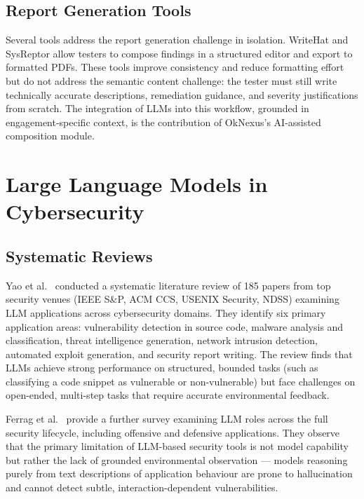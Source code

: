 \subsection{Report Generation Tools}

Several tools address the report generation challenge in isolation. WriteHat and SysReptor allow testers to compose findings in a structured editor and export to formatted PDFs. These tools improve consistency and reduce formatting effort but do not address the semantic content challenge: the tester must still write technically accurate descriptions, remediation guidance, and severity justifications from scratch. The integration of LLMs into this workflow, grounded in engagement-specific context, is the contribution of OkNexus's AI-assisted composition module.

\section{Large Language Models in Cybersecurity}

\subsection{Systematic Reviews}

Yao et al.\ \cite{llm_cybersecurity_survey2024} conducted a systematic literature review of 185 papers from top security venues (IEEE S\&P, ACM CCS, USENIX Security, NDSS) examining LLM applications across cybersecurity domains. They identify six primary application areas: vulnerability detection in source code, malware analysis and classification, threat intelligence generation, network intrusion detection, automated exploit generation, and security report writing. The review finds that LLMs achieve strong performance on structured, bounded tasks (such as classifying a code snippet as vulnerable or non-vulnerable) but face challenges on open-ended, multi-step tasks that require accurate environmental feedback.

Ferrag et al.\ \cite{llm_cybersecurity_exploring2025} provide a further survey examining LLM roles across the full security lifecycle, including offensive and defensive applications. They observe that the primary limitation of LLM-based security tools is not model capability but rather the lack of grounded environmental observation --- models reasoning purely from text descriptions of application behaviour are prone to hallucination and cannot detect subtle, interaction-dependent vulnerabilities.

